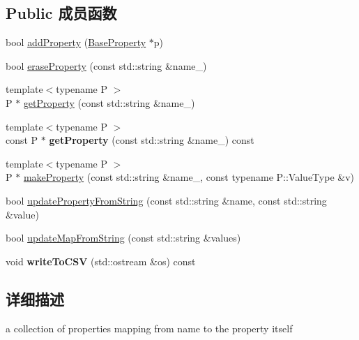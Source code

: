 \subsection*{Public 成员函数}
\begin{DoxyCompactItemize}
\item 
bool \hyperlink{classg2o_1_1PropertyMap_a6b90b5cfd16125c174e140af6e40dad9}{add\-Property} (\hyperlink{classg2o_1_1BaseProperty}{Base\-Property} $\ast$p)
\item 
bool \hyperlink{classg2o_1_1PropertyMap_a8f96ea923fe711a0ffa6e4c6479945d9}{erase\-Property} (const std\-::string \&name\-\_\-)
\item 
{\footnotesize template$<$typename P $>$ }\\P $\ast$ \hyperlink{classg2o_1_1PropertyMap_ab3a37fb6f8358f3c63a13678349f1f82}{get\-Property} (const std\-::string \&name\-\_\-)
\item 
\hypertarget{classg2o_1_1PropertyMap_a4681e164dc742b78b74684bfad09d47c}{{\footnotesize template$<$typename P $>$ }\\const P $\ast$ {\bfseries get\-Property} (const std\-::string \&name\-\_\-) const }\label{classg2o_1_1PropertyMap_a4681e164dc742b78b74684bfad09d47c}

\item 
{\footnotesize template$<$typename P $>$ }\\P $\ast$ \hyperlink{classg2o_1_1PropertyMap_add6e602dcd651b8883c30c350d23692f}{make\-Property} (const std\-::string \&name\-\_\-, const typename P\-::\-Value\-Type \&v)
\item 
bool \hyperlink{classg2o_1_1PropertyMap_a43df66ba15f9425abbd0e888a7b67251}{update\-Property\-From\-String} (const std\-::string \&name, const std\-::string \&value)
\item 
bool \hyperlink{classg2o_1_1PropertyMap_a0407e6a72afafd608f13cfdffc6ffc06}{update\-Map\-From\-String} (const std\-::string \&values)
\item 
\hypertarget{classg2o_1_1PropertyMap_a02712d41356082bb724812927b1eef89}{void {\bfseries write\-To\-C\-S\-V} (std\-::ostream \&os) const }\label{classg2o_1_1PropertyMap_a02712d41356082bb724812927b1eef89}

\end{DoxyCompactItemize}


\subsection{详细描述}
a collection of properties mapping from name to the property itself 

